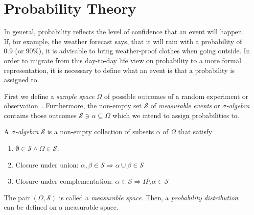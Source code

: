 \section{Probability Theory}
\label{sec:probability-theory}
In general, probability reflects the level of confidence that an event will happen. If, for example,
the weather forecast says, that it will rain with a probability of $0.9$ (or $90\%$), it is
advisable to bring weather-proof clothes when going outside. In order to migrate from this
day-to-day life view on probability to a more formal representation, it is necessary to define what
an event is that a probability is assigned to.

First we define a \emph{sample space} $\Omega$ of possible outcomes of a random experiment or
observation~\citep[17]{billingsley_95_probability}. Furthermore,
the non-empty set $\mathcal{S}$ of \emph{measurable events} or \emph{$\sigma$-algebra} contains those outcomes $\mathcal{S} \ni
\alpha \subseteq \Omega$ which we intend to assign probabilities to.
\begin{mydef}
    \label{def:sigma-algebra}
    A \emph{$\sigma$-algebra} $\mathcal{S}$ is a non-empty collection of subsets $\alpha$ of
    $\Omega$ that satisfy
    \begin{enumerate}
          \item $\emptyset \in \mathcal{S} \wedge \Omega \in \mathcal{S}$. \label{itm:sample-space-one}
          \item Closure under union: $\alpha, \beta \in \mathcal{S} \Rightarrow \alpha \cup \beta \in
        \mathcal{S}$ \label{itm:sample-space-two}
          \item Closure under complementation: $\alpha \in \mathcal{S} \Rightarrow \Omega \setminus
        \alpha \in \mathcal{S}$ \label{itm:sample-space-three}
    \end{enumerate}
\end{mydef}
The pair $(\Omega, \mathcal{S})$ is called a \emph{measurable space}. Then, a \emph{probability
    distribution} can be defined on a measurable space.

